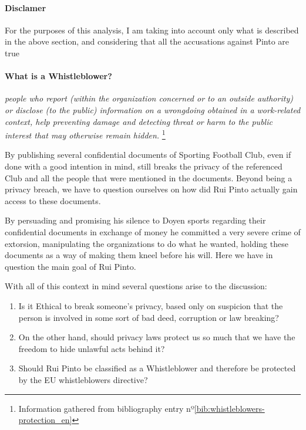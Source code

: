 \paragraph{Disclamer} For the purposes of this analysis, I am taking into account only what is described in the above section, and considering that all the accusations against Pinto are true

\paragraph{What is a Whistleblower?}
\textit{people who report (within the organization concerned or to an outside authority) or disclose (to the public) information on a wrongdoing obtained in a work-related context, help preventing damage and detecting threat or harm to the public interest that may otherwise remain hidden.}
\footnote{Information gathered from bibliography entry nº\ref{bib:whistleblowers-protection_en}}


By publishing several confidential documents of Sporting Football Club, even if done with a good intention in mind, still breaks the privacy of the referenced Club and all the people that were mentioned in the documents.
Beyond being a privacy breach, we have to question ourselves on how did Rui Pinto actually gain access to these documents.

By persuading and promising his silence to Doyen sports regarding their confidential documents in exchange of money he committed a very severe crime of extorsion, manipulating the organizations to do what he wanted, holding these documents as a way of making them kneel before his will.
Here we have in question the main goal of Rui Pinto.

With all of this context in mind several questions arise to the discussion:
\begin{enumerate}
    \item Is it Ethical to break someone's privacy, based only on suspicion that the person is involved in some sort of bad deed, corruption or law breaking?
    \item On the other hand, should privacy laws protect us so much that we have the freedom to hide unlawful acts behind it?
    \item Should Rui Pinto be classified as a Whistleblower and therefore be protected by the EU whistleblowers directive?
\end{enumerate}

